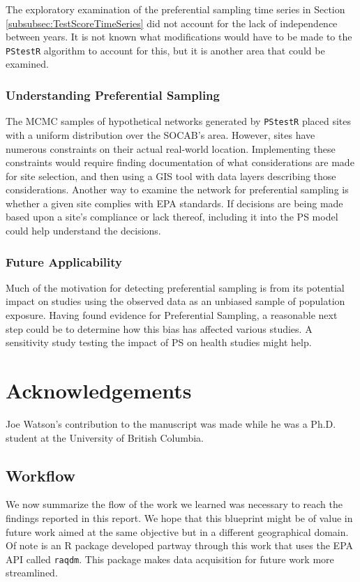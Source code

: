 \documentclass{article}
\begin{document}
The exploratory examination of the preferential sampling time series in Section \ref{subsubsec:TestScoreTimeSeries} did not account for the lack of independence between years.  It is not known what modifications would have to be made to the \texttt{PStestR} algorithm to account for this, but it is another area that could be examined.

\subsubsection*{Understanding Preferential Sampling}
\label{subsubsec:understandingPF}

The MCMC samples of hypothetical networks generated by \texttt{PStestR} placed sites with a uniform distribution over the SOCAB's area.  However, sites have numerous constraints on their actual real-world location.  Implementing these constraints would require finding documentation of what considerations are made for site selection, and then using a GIS tool with data layers describing those considerations.  Another way to examine the network for preferential sampling is whether a given site complies with \ac{EPA} standards.  If decisions are being made based upon a site's compliance or lack thereof, including it into the \ac{PS} model could help understand the decisions.

\subsubsection*{Future Applicability}
\label{subsubsec:futureapps}
Much of the motivation for detecting preferential sampling is from its potential impact on studies using the observed data as an unbiased sample of population exposure.  Having found evidence for Preferential Sampling, a reasonable next step could be to determine how this bias has affected various studies.  A sensitivity study testing the impact of \ac{PS} on health studies might help.

\section{Acknowledgements}\label{sec:acknowledgements}
Joe Watson's contribution to 
the manuscript was made while he was a 
Ph.D. student at the University of 
British Columbia. 


\subsection{Workflow}
\label{subsec:workflow}
We now summarize the flow of the work we learned was necessary to reach the findings reported in this report. We hope that this blueprint might be of value in future work aimed at the same objective but in a different geographical domain.  Of note is an R package developed partway through this work that uses the EPA API called \texttt{raqdm}.  This package makes data acquisition for future work more streamlined.
\end{document}
